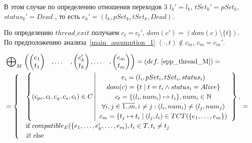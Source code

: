 В этом случае по определению отношения переходов 3 $l_k'=l_k$, $tSet_k'=pSet_k$, $status_k'=Dead$ , то есть $e_k' = (l_k, pSet_k, tSet_k, Dead)$.

По определению $thread\_exit$ получаем $c_t = c_t'$, $dom(c') = (dom(c) \setminus \{t\})$.
По предположению анализа~\ref{main_assumption_1} $(\cdot, t) \notin c_m$, $c_m = c_m'$.

\begin{align}
& \mathrel{\bigoplus}_M
\begin{pmatrix}
\begin{pmatrix}
e_1 \\
t_1 
\end{pmatrix}& ,
\dots& ,
\begin{pmatrix}
e_k' \\
t_k 
\end{pmatrix},
\dots& ,
\begin{pmatrix}
e_m \\
t_m 
\end{pmatrix}
\end{pmatrix} = (def.~\ref{epp_thread_M}) =\nonumber \\
& = \begin{cases}
& \left\lbrace (c_{pc},c_l,c_g,c_s, c_t) \in C 
\left| 
\begin{array}{c}
e_i = (l_i, pSet_i, tSet_i, status_i) \\
dom(c) = \{t \mid t = t_i \land status_i = Alive\}\\
c_t = \{(l_i, num_i) \mapsto t_i\}, num_i \in \mathbb{N} \\
\forall i, j \in \overline{1..m}, i \neq j: (l_i, num_i) \neq (l_j, num_j)\\
c_m = \{ t_j \mapsto t_i \mid (l_j, l_i) \in TCT(\{e_1, \dots, e_m\}) \\
\end{array}
\right.
\right\rbrace, \\
& \mbox{if } compatible_{E}(\{e_1, \dots, e_k', \dots, e_m), t_i \in T, t_i \neq t_j \\
& \varnothing \mbox{ else}
\end{cases} = \nonumber
\end{align}

